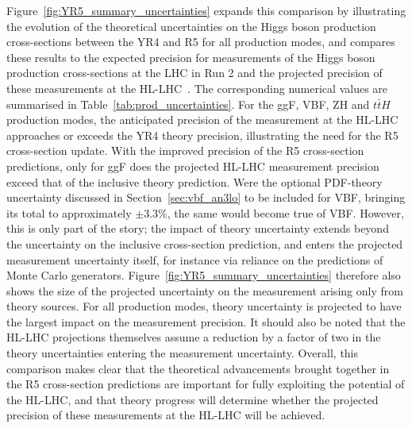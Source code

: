 Figure~\ref{fig:YR5_summary_uncertainties} expands this comparison by
illustrating the evolution of the theoretical uncertainties on the Higgs
boson production cross-sections between the YR4 and R5 for all production
modes, and compares these results to the expected precision for measurements of the
Higgs boson production cross-sections at the LHC in Run 2
\cite{ATLAS:2026comb,CMS:2026nce} and the projected precision of these
measurements at the HL-LHC~\cite{ATLAS:2022hsp}. The corresponding numerical
values are summarised in Table~\ref{tab:prod_uncertainties}. For the ggF,
VBF, ZH and $t\bar t H$ production modes, the anticipated precision of the
measurement at the HL-LHC approaches or exceeds the YR4 theory
precision, illustrating the need for the R5 cross-section update. With the
improved precision of the R5 cross-section predictions, only for ggF does the
projected HL-LHC measurement precision exceed that of the inclusive theory
prediction. Were the optional PDF-theory uncertainty discussed in
Section~\ref{sec:vbf_an3lo} to be included for VBF, bringing its total to
approximately $\pm3.3\%$, the same would become true of VBF. However, this is only part of the story; 
the impact of theory uncertainty extends beyond the uncertainty on the inclusive cross-section
prediction, and enters the projected measurement uncertainty itself, for instance via reliance on the predictions 
of Monte Carlo generators. Figure~\ref{fig:YR5_summary_uncertainties} therefore also shows the size of the projected uncertainty 
on the measurement arising only from theory sources. For all production modes, theory uncertainty is projected
to have the largest impact on the measurement precision. It should also
be noted that the HL-LHC projections themselves assume a reduction by a
factor of two in the theory uncertainties entering the measurement uncertainty. Overall, this
comparison makes clear that the theoretical
advancements brought together in the R5 cross-section predictions are
important for fully exploiting the potential of the HL-LHC, and that theory progress will determine
whether the projected precision of these measurements at the HL-LHC will be achieved. 

